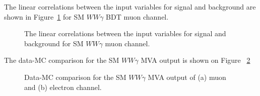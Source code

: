 The linear correlations between the input variables for signal and background are shown in Figure~\ref{fig:corrSMmu} for SM $WW\gamma$ BDT muon channel.

\begin{figure}[]
  \begin{center}
    \caption{ The linear correlations between the input variables for signal and background for SM $WW\gamma$ muon channel. }
    \label{fig:corrSMmu}
  \end{center}
\end{figure}

The data-MC comparison for the SM $WW\gamma$ MVA output is shown on Figure ~\ref{fig:outSMmu}

\begin{figure}[]
  \begin{center}
    \caption{ Data-MC comparison for the SM $WW\gamma$ MVA output of (a) muon and (b) electron channel. }
    \label{fig:outSMmu}
  \end{center}
\end{figure}

